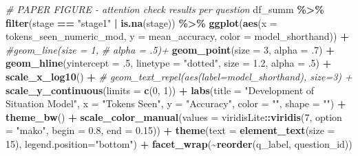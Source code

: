 \documentclass[
]{article}
\newenvironment{Shaded}{\begin{snugshade}}{\end{snugshade}}
\newcommand{\AttributeTok}[1]{\textcolor[rgb]{0.13,0.29,0.53}{#1}}
\newcommand{\CommentTok}[1]{\textcolor[rgb]{0.56,0.35,0.01}{\textit{#1}}}
\newcommand{\DecValTok}[1]{\textcolor[rgb]{0.00,0.00,0.81}{#1}}
\newcommand{\FloatTok}[1]{\textcolor[rgb]{0.00,0.00,0.81}{#1}}
\newcommand{\FunctionTok}[1]{\textcolor[rgb]{0.13,0.29,0.53}{\textbf{#1}}}
\newcommand{\NormalTok}[1]{#1}
\newcommand{\SpecialCharTok}[1]{\textcolor[rgb]{0.81,0.36,0.00}{\textbf{#1}}}
\newcommand{\StringTok}[1]{\textcolor[rgb]{0.31,0.60,0.02}{#1}}
\begin{document}
\begin{Shaded}
\begin{Highlighting}[]
\CommentTok{\# PAPER FIGURE {-} attention check results per question}
\NormalTok{df\_summ }\SpecialCharTok{\%\textgreater{}\%}
  \FunctionTok{filter}\NormalTok{(stage }\SpecialCharTok{==} \StringTok{"stage1"} \SpecialCharTok{|} \FunctionTok{is.na}\NormalTok{(stage)) }\SpecialCharTok{\%\textgreater{}\%}
  \FunctionTok{ggplot}\NormalTok{(}\FunctionTok{aes}\NormalTok{(}\AttributeTok{x =}\NormalTok{ tokens\_seen\_numeric\_mod,}
             \AttributeTok{y =}\NormalTok{ mean\_accuracy,}
             \AttributeTok{color =}\NormalTok{ model\_shorthand)) }\SpecialCharTok{+}
  \CommentTok{\#geom\_line(size = 1,}
  \CommentTok{\#           alpha = .5)+}
  \FunctionTok{geom\_point}\NormalTok{(}\AttributeTok{size =} \DecValTok{3}\NormalTok{,}
             \AttributeTok{alpha =}\NormalTok{ .}\DecValTok{7}\NormalTok{) }\SpecialCharTok{+}
  \FunctionTok{geom\_hline}\NormalTok{(}\AttributeTok{yintercept =}\NormalTok{ .}\DecValTok{5}\NormalTok{, }\AttributeTok{linetype =} \StringTok{"dotted"}\NormalTok{,}
             \AttributeTok{size =} \FloatTok{1.2}\NormalTok{, }\AttributeTok{alpha =}\NormalTok{ .}\DecValTok{5}\NormalTok{) }\SpecialCharTok{+}
  \FunctionTok{scale\_x\_log10}\NormalTok{() }\SpecialCharTok{+}
  \CommentTok{\# geom\_text\_repel(aes(label=model\_shorthand), size=3) +}
  \FunctionTok{scale\_y\_continuous}\NormalTok{(}\AttributeTok{limits =} \FunctionTok{c}\NormalTok{(}\DecValTok{0}\NormalTok{, }\DecValTok{1}\NormalTok{)) }\SpecialCharTok{+}
  \FunctionTok{labs}\NormalTok{(}\AttributeTok{title =} \StringTok{"Development of Situation Model"}\NormalTok{, }
       \AttributeTok{x =} \StringTok{"Tokens Seen"}\NormalTok{,}
       \AttributeTok{y =} \StringTok{"Accuracy"}\NormalTok{,}
       \AttributeTok{color =} \StringTok{""}\NormalTok{,}
       \AttributeTok{shape =} \StringTok{""}\NormalTok{) }\SpecialCharTok{+}
  \FunctionTok{theme\_bw}\NormalTok{() }\SpecialCharTok{+}
  \FunctionTok{scale\_color\_manual}\NormalTok{(}\AttributeTok{values =}\NormalTok{ viridisLite}\SpecialCharTok{::}\FunctionTok{viridis}\NormalTok{(}\DecValTok{7}\NormalTok{, }\AttributeTok{option =} \StringTok{"mako"}\NormalTok{, }
                                                  \AttributeTok{begin =} \FloatTok{0.8}\NormalTok{, }\AttributeTok{end =} \FloatTok{0.15}\NormalTok{)) }\SpecialCharTok{+}
  \FunctionTok{theme}\NormalTok{(}\AttributeTok{text =} \FunctionTok{element\_text}\NormalTok{(}\AttributeTok{size =} \DecValTok{15}\NormalTok{),}
        \AttributeTok{legend.position=}\StringTok{"bottom"}\NormalTok{) }\SpecialCharTok{+}
  \FunctionTok{facet\_wrap}\NormalTok{(}\SpecialCharTok{\textasciitilde{}}\FunctionTok{reorder}\NormalTok{(q\_label, question\_id))}
\end{Highlighting}
\end{Shaded}
\end{document}
